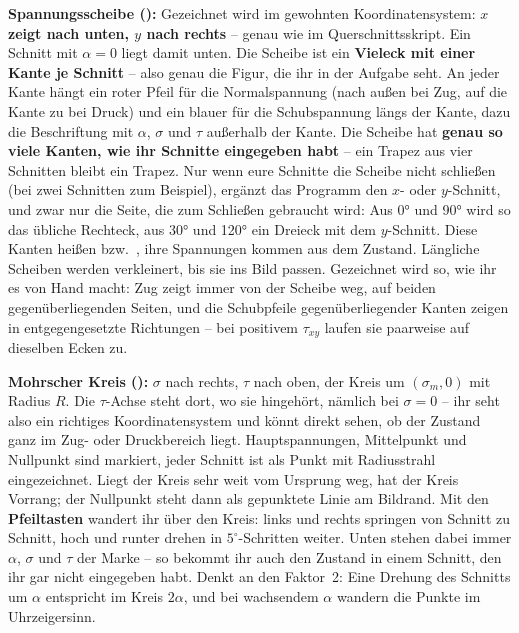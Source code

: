 \textbf{Spannungsscheibe ():} Gezeichnet wird im gewohnten Koordinatensystem:
\textbf{$x$ zeigt nach unten, $y$ nach rechts} -- genau wie im Querschnittsskript. Ein Schnitt mit
$\alpha = 0$ liegt damit unten. Die Scheibe ist ein \textbf{Vieleck mit einer Kante je
Schnitt} -- also genau die Figur, die ihr in der Aufgabe seht. An jeder Kante hängt ein roter
Pfeil für die Normalspannung (nach außen bei Zug, auf die Kante zu bei Druck) und ein blauer für
die Schubspannung längs der Kante, dazu die Beschriftung mit $\alpha$, $\sigma$ und $\tau$
außerhalb der Kante. Die Scheibe hat \textbf{genau so viele Kanten, wie ihr Schnitte eingegeben
habt} -- ein Trapez aus vier Schnitten bleibt ein Trapez. Nur wenn eure Schnitte die Scheibe nicht
schließen (bei zwei Schnitten zum Beispiel), ergänzt das Programm den $x$- oder $y$-Schnitt, und
zwar nur die Seite, die zum Schließen gebraucht wird: Aus 0° und 90° wird so das übliche Rechteck,
aus 30° und 120° ein Dreieck mit dem $y$-Schnitt. Diese Kanten heißen  bzw.\
, ihre Spannungen kommen aus dem Zustand. Längliche Scheiben werden verkleinert,
bis sie ins Bild passen. Gezeichnet wird so, wie ihr es von Hand macht: Zug zeigt immer von der Scheibe weg, auf beiden
gegenüberliegenden Seiten, und die Schubpfeile gegenüberliegender Kanten zeigen in
entgegengesetzte Richtungen -- bei positivem $\tau_{xy}$ laufen sie paarweise auf dieselben Ecken zu.

\textbf{Mohrscher Kreis ():} $\sigma$ nach rechts, $\tau$ nach oben, der Kreis um
$(\sigma_m, 0)$ mit Radius $R$. Die $\tau$-Achse steht dort, wo sie hingehört, nämlich bei
$\sigma = 0$ -- ihr seht also ein richtiges Koordinatensystem und könnt direkt sehen, ob der
Zustand ganz im Zug- oder Druckbereich liegt. Hauptspannungen, Mittelpunkt und Nullpunkt sind
markiert, jeder Schnitt ist als Punkt mit Radiusstrahl eingezeichnet. Liegt der Kreis sehr weit
vom Ursprung weg, hat der Kreis Vorrang; der Nullpunkt steht dann als gepunktete Linie am
Bildrand. Mit den \textbf{Pfeiltasten} wandert ihr über den Kreis: links und rechts springen von
Schnitt zu Schnitt, hoch und runter drehen in $5^\circ$-Schritten weiter. Unten stehen dabei
immer $\alpha$, $\sigma$ und $\tau$ der Marke -- so bekommt ihr auch den Zustand in einem Schnitt,
den ihr gar nicht eingegeben habt. Denkt an den Faktor~2: Eine Drehung des Schnitts um $\alpha$ entspricht im Kreis
$2\alpha$, und bei wachsendem $\alpha$ wandern die Punkte im Uhrzeigersinn.


